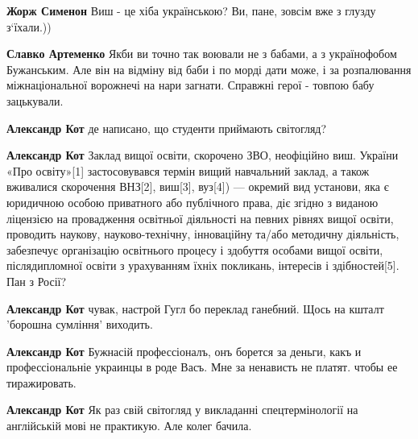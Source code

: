 \begin{itemize}
\begin{itemize}
\textbf{Жорж Сименон} Виш - це хіба українською? Ви, пане, зовсім вже з глузду з`їхали.))


\textbf{Славко Артеменко} Якби ви точно так воювали не з бабами, а з українофобом Бужанським. Але він на відміну від баби і по морді дати може, і за розпалювання міжнаціональної ворожнечі на нари загнати. Справжні герої - товпою бабу зацькували.


\textbf{Александр Кот} де написано, що студенти приймають світогляд?


\textbf{Александр Кот} Заклад вищої освіти, скорочено ЗВО, неофіційно виш. України «Про освіту»[1] застосовувався термін вищий навчальний заклад, а також вживалися скорочення ВНЗ[2], виш[3], вуз[4]) — окремий вид установи, яка є юридичною особою приватного або публічного права, діє згідно з виданою ліцензією на провадження освітньої діяльності на певних рівнях вищої освіти, проводить наукову, науково-технічну, інноваційну та/або методичну діяльність, забезпечує організацію освітнього процесу і здобуття особами вищої освіти, післядипломної освіти з урахуванням їхніх покликань, інтересів і здібностей[5].
Пан з Росії?


\textbf{Александр Кот} чувак, настрой Гугл бо переклад ганебний. Щось на кшталт 'борошна сумління' виходить.


\textbf{Александр Кот} Бужнасій профессіоналъ, онъ борется за деньги, какъ и профессіональніе украинцы в роде Васъ. Мне за ненависть не платят. чтобы ее тиражировать.


\textbf{Александр Кот} Як раз свій світогляд у викладанні спецтермінології на англійській мові не практикую. Але колег бачила.


\end{itemize}
\end{itemize}
